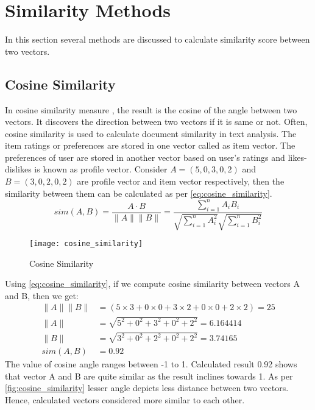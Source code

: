 
\section{Similarity Methods}
\label{similarity_methods}
In this section several methods are discussed to calculate similarity score between two vectors.
\subsection{Cosine Similarity}
\label{cosine_similarity}

In cosine similarity measure \cite{19}, the result is the cosine of the angle between two vectors. It  discovers the direction between two vectors if it is same or not. Often, cosine similarity is used to calculate document similarity in text analysis. The item ratings or preferences are stored in one vector called as item vector. The preferences of user are stored in another vector based on user's ratings and likes-dislikes is known as profile vector. Consider $A = (5,0,3,0,2)$ and $B = (3,0,2,0,2)$ are profile vector and item vector respectively, then the similarity between them can be calculated as per \autoref{eq:cosine_similarity}.
\begin{equation}
sim(A,B) = \frac {A \cdot B}{\parallel A \parallel \parallel B \parallel} = \frac{\sum_{i=1}^{n} {A_{i} B_{i}}}{\sqrt{\sum_{i=1}^{n} {A_{i}^2}} \sqrt{\sum_{i=1}^{n} {B_{i}^2}}}
\label{eq:cosine_similarity}
\end{equation}
\begin{figure}[H]
	\centering
	\texttt{[image: cosine\_similarity]}
	\caption{Cosine Similarity}
	\label{fig:cosine_similarity}
\end{figure}
\noindent
Using \autoref{eq:cosine_similarity}, if we compute cosine similarity between vectors A and B, then we get:
\begin{align*}
\parallel A \parallel \parallel B \parallel &=(5 \times 3 + 0 \times 0 + 3 \times 2 + 0 \times 0 + 2 \times 2  ) = 25 \\
\parallel A \parallel  &= \sqrt{5^2 + 0^2 + 3^2 + 0^2 + 2^2}  = 6.164414 \\	     
\parallel B \parallel  &= \sqrt{3^2 + 0^2 + 2^2 + 0^2 + 2^2}  = 3.74165\\	     
sim(A,B)  &=  0.92 
\end{align*}
\noindent The value of cosine angle ranges between -1 to 1. Calculated result 0.92 shows that vector A and B are quite similar as the result inclines towards 1. As per \autoref{fig:cosine_similarity} lesser angle depicts less distance between two vectors. Hence, calculated vectors considered more similar to each other.

